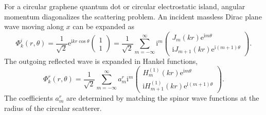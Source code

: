 \documentclass[11pt]{article}
\newcommand{\ii}{\mathrm i}
\newcommand{\ee}{\mathrm e}
\begin{document}
For a circular graphene quantum dot or circular electrostatic island, angular momentum diagonalizes the scattering problem. An incident massless Dirac plane wave moving along \(x\) can be expanded as
\begin{equation}
  \Phi^i_k(r,\theta)=\frac{1}{\sqrt2}\ee^{\ii kr\cos\theta}
  \begin{pmatrix}1\\1\end{pmatrix}
  =\frac{1}{\sqrt2}\sum_{m=-\infty}^{\infty}\ii^m
  \begin{pmatrix}
    J_m(kr)\ee^{\ii m\theta}\\
    \ii J_{m+1}(kr)\ee^{\ii(m+1)\theta}
  \end{pmatrix}.
\end{equation}
The outgoing reflected wave is expanded in Hankel functions,
\begin{equation}
  \Phi^r_k(r,\theta)=\frac{1}{\sqrt2}\sum_{m=-\infty}^{\infty}a_m^r\ii^m
  \begin{pmatrix}
    H_m^{(1)}(kr)\ee^{\ii m\theta}\\
    \ii H_{m+1}^{(1)}(kr)\ee^{\ii(m+1)\theta}
  \end{pmatrix}.
\end{equation}
The coefficients \(a_m^r\) are determined by matching the spinor wave functions at the radius of the circular scatterer.
\end{document}
